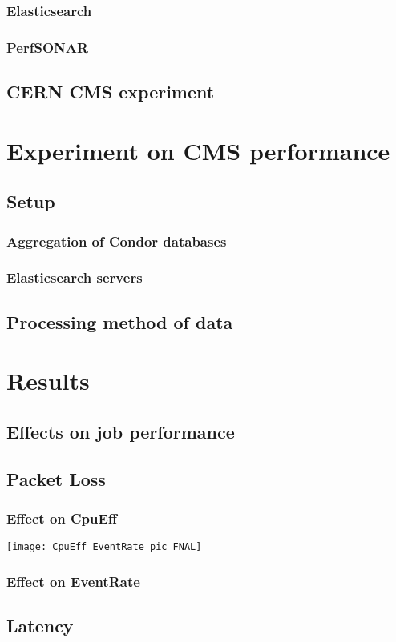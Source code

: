 \documentclass[]{article}
\begin{document}
\subsubsection{Elasticsearch}
\subsubsection{PerfSONAR}
\subsection{CERN CMS experiment}
\section{Experiment on CMS performance}
\subsection{Setup}
\subsubsection{Aggregation of Condor databases}
\subsubsection{Elasticsearch servers}
\subsection{Processing method of data}
\section{Results}
\subsection{Effects on job performance}
\subsection{Packet Loss}
\subsubsection{Effect on CpuEff}
\texttt{[image: CpuEff\_EventRate\_pic\_FNAL]}
\subsubsection{Effect on EventRate}
\subsection{Latency}
\end{document}
